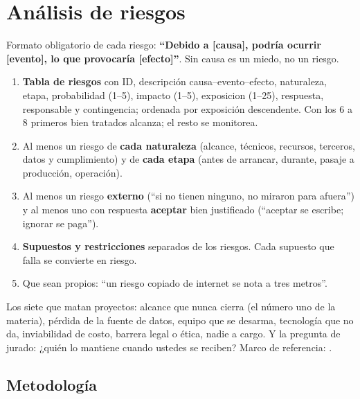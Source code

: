 
\chapter{Análisis de riesgos}\label{cap:riesgos}

\begin{guia}
Formato obligatorio de cada riesgo: \textbf{``Debido a [causa], podría
ocurrir [evento], lo que provocaría [efecto]''}. Sin causa es un miedo,
no un riesgo.
\begin{enumerate}
    \item \textbf{Tabla de riesgos} con ID, descripción causa--evento--efecto,
          naturaleza, etapa, probabilidad (1--5), impacto (1--5),
          \gls{exposicion} (1--25), respuesta, responsable y contingencia;
          ordenada por exposición descendente. Con los 6 a 8 primeros bien
          tratados alcanza; el resto se monitorea.
    \item Al menos un riesgo de \textbf{cada naturaleza} (alcance, técnicos,
          recursos, terceros, datos y cumplimiento) y de \textbf{cada etapa}
          (antes de arrancar, durante, pasaje a producción, operación).
    \item Al menos un riesgo \textbf{externo} (``si no tienen ninguno, no
          miraron para afuera'') y al menos uno con respuesta
          \textbf{aceptar} bien justificado (``aceptar se escribe; ignorar
          se paga'').
    \item \textbf{Supuestos y restricciones} separados de los riesgos. Cada
          supuesto que falla se convierte en riesgo.
    \item Que sean propios: ``un riesgo copiado de internet se nota a tres
          metros''.
\end{enumerate}
Los siete que matan proyectos: alcance que nunca cierra (el número uno
de la materia), pérdida de la fuente de datos, equipo que se desarma,
tecnología que no da, inviabilidad de costo, barrera legal o ética,
nadie a cargo. Y la pregunta de jurado: ¿quién lo mantiene cuando
ustedes se reciben? Marco de referencia: \citet{pmi2021}.
\end{guia}

\section{Metodología}

